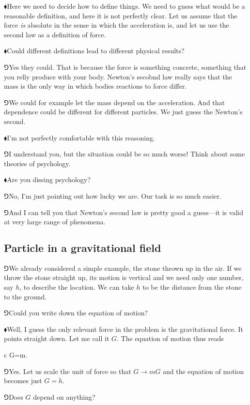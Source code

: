 \documentclass[11pt,oneside%
]{memoir}
\newenvironment{eqna}{\begin{IEEEeqnarray*}{c}}{\end{IEEEeqnarray*}\ignorespacesafterend}
\newcommand{\hea}{\(\blacklozenge\)\;}
\newcommand{\heb}{\(\Game\)\;}
\begin{document}
\hea Here we need to decide how to define things. We need to guess what would be a reasonable definition, and here it is not perfectly clear. Let us assume that the force \emph{is} absolute in the sense in which the acceleration is, and let us use the second law as a definition of force.

\hea Could different definitions lead to different physical results?

\heb Yes they could. That is because the force is something concrete, something that you relly produce with your body. Newton's secobnd law really says that the mass is the only way in which bodies reactions to force differ.

\heb We could for example let the mass depend on the acceleration. And that dependence could be different for different particles. We just guess the Newton's second.

\hea I'm not perfectly comfortable with this reasoning.

\heb I understand you, but the situation could be so much worse! Think about some theories of psychology.

\hea Are you dissing psychology?

\heb No, I'm just pointing out how lucky we are. Our task is so much easier.

\heb And I can tell you that Newton's second law is pretty good a guess---it is valid at very large range of phenomena.
\subsection{Particle in a gravitational field}
\heb We already considered a simple example, the stone thrown up in the air. If we throw the stone straight up, its motion is vertical and we need only one number, say \(h\), to describe the location. We can take \(h\) to be the distance from the stone to the ground.

\heb Could you write down the equation of motion?

\hea Well, I guess the only relevant force in the problem is the gravitational force. It points straight down. Let me call it \(G\). The equation of motion thus reads
\begin{eqna}
    G=m.
\end{eqna}

\heb Yes. Let us scale the unit of force so that \(G\rightarrow mG\) and the equation of motion becomes just \(G=\ddot{h}\).

\heb Does \(G\) depend on anything?
\end{document}
